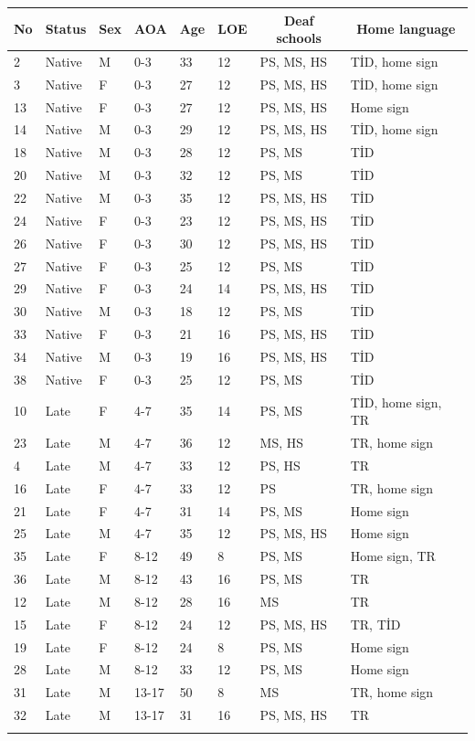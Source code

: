 \documentclass[review]{elsarticle} %
\begin{document}
\begin{table}[hbt!]
\begin{center}
\begin{threeparttable}
{\begin{tabular}{llllllll}
\toprule
No & \multicolumn{1}{c}{Status} & \multicolumn{1}{c}{Sex} & \multicolumn{1}{c}{AOA} & \multicolumn{1}{c}{Age} & \multicolumn{1}{c}{LOE} & \multicolumn{1}{c}{Deaf schools} & \multicolumn{1}{c}{Home language}\\
\midrule
2 & Native & M & 0-3 & 33 & 12 & PS, MS, HS & TİD, home sign\\
3 & Native & F & 0-3 & 27 & 12 & PS, MS, HS & TİD, home sign\\
13 & Native & F & 0-3 & 27 & 12 & PS, MS, HS & Home sign\\
14 & Native & M & 0-3 & 29 & 12 & PS, MS, HS & TİD, home sign\\
18 & Native & M & 0-3 & 28 & 12 & PS, MS & TİD\\
20 & Native & M & 0-3 & 32 & 12 & PS, MS & TİD\\
22 & Native & M & 0-3 & 35 & 12 & PS, MS, HS & TİD\\
24 & Native & F & 0-3 & 23 & 12 & PS, MS, HS & TİD\\
26 & Native & F & 0-3 & 30 & 12 & PS, MS, HS & TİD\\
27 & Native & F & 0-3 & 25 & 12 & PS, MS & TİD\\
29 & Native & F & 0-3 & 24 & 14 & PS, MS, HS & TİD\\
30 & Native & M & 0-3 & 18 & 12 & PS, MS & TİD\\
33 & Native & F & 0-3 & 21 & 16 & PS, MS, HS & TİD\\
34 & Native & M & 0-3 & 19 & 16 & PS, MS, HS & TİD\\
38 & Native & F & 0-3 & 25 & 12 & PS, MS & TİD\\
10 & Late & F & 4-7 & 35 & 14 & PS, MS & TİD, home sign, TR\\
23 & Late & M & 4-7 & 36 & 12 & MS, HS & TR, home sign\\
4 & Late & M & 4-7 & 33 & 12 & PS, HS & TR\\
16 & Late & F & 4-7 & 33 & 12 & PS & TR, home sign\\
21 & Late & F & 4-7 & 31 & 14 & PS, MS & Home sign\\
25 & Late & M & 4-7 & 35 & 12 & PS, MS, HS & Home sign\\
35 & Late & F & 8-12 & 49 & 8 & PS, MS & Home sign, TR\\
36 & Late & M & 8-12 & 43 & 16 & PS, MS & TR\\
12 & Late & M & 8-12 & 28 & 16 & MS & TR\\
15 & Late & F & 8-12 & 24 & 12 & PS, MS, HS & TR, TİD\\
19 & Late & F & 8-12 & 24 & 8 & PS, MS & Home sign\\
28 & Late & M & 8-12 & 33 & 12 & PS, MS & Home sign\\
31 & Late & M & 13-17 & 50 & 8 & MS & TR, home sign\\
32 & Late & M & 13-17 & 31 & 16 & PS, MS, HS & TR\\
\bottomrule
\addlinespace
\end{tabular}

}
\end{threeparttable}
\end{center}
\end{table}
\end{document}
